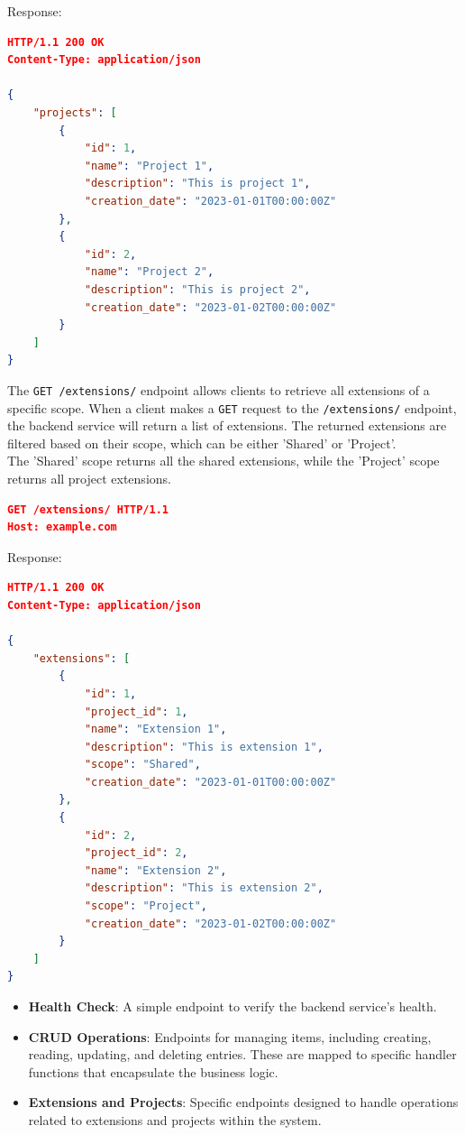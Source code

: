 Response:

\begin{lstlisting}[language=json,label={lst:lstlisting12}]
HTTP/1.1 200 OK
Content-Type: application/json

{
    "projects": [
        {
            "id": 1,
            "name": "Project 1",
            "description": "This is project 1",
            "creation_date": "2023-01-01T00:00:00Z"
        },
        {
            "id": 2,
            "name": "Project 2",
            "description": "This is project 2",
            "creation_date": "2023-01-02T00:00:00Z"
        }
    ]
}
\end{lstlisting}


The \texttt{GET /extensions/} endpoint allows clients to retrieve all extensions of a specific scope.
When a client makes a \texttt{GET} request to the \texttt{/extensions/} endpoint, the backend service will return a list of extensions.
The returned extensions are filtered based on their scope, which can be either 'Shared' or 'Project'.
\\The 'Shared' scope returns all the shared extensions, while the 'Project' scope returns all project extensions.
\\
\begin{lstlisting}[language=json,label={lst:lstlisting13}]
GET /extensions/ HTTP/1.1
Host: example.com
\end{lstlisting}

Response:

\begin{lstlisting}[language=json,label={lst:lstlisting14}]
HTTP/1.1 200 OK
Content-Type: application/json

{
    "extensions": [
        {
            "id": 1,
            "project_id": 1,
            "name": "Extension 1",
            "description": "This is extension 1",
            "scope": "Shared",
            "creation_date": "2023-01-01T00:00:00Z"
        },
        {
            "id": 2,
            "project_id": 2,
            "name": "Extension 2",
            "description": "This is extension 2",
            "scope": "Project",
            "creation_date": "2023-01-02T00:00:00Z"
        }
    ]
}
\end{lstlisting}

\begin{itemize}
    \item \textbf{Health Check}: A simple endpoint to verify the backend service's health.
    \item \textbf{CRUD Operations}: Endpoints for managing items, including creating, reading, updating, and deleting entries.
    These are mapped to specific handler functions that encapsulate the business logic.
    \item \textbf{Extensions and Projects}: Specific endpoints designed to handle operations related to extensions and projects within the system.
\end{itemize}

